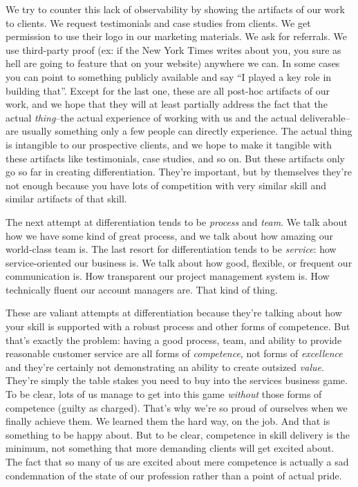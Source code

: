 We try to counter this lack of observability by showing the artifacts of our work to clients. We request testimonials and case studies from clients. We get permission to use their logo in our marketing materials. We ask for referrals. We use third-party proof (ex: if the New York Times writes about you, you sure as hell are going to feature that on your website) anywhere we can. In some cases you can point to something publicly available and say ``I played a key role in building that''. Except for the last one, these are all post-hoc artifacts of our work, and we hope that they will at least partially address the fact that the actual \emph{thing}--the actual experience of working with us and the actual deliverable--are usually something only a few people can directly experience. The actual thing is intangible to our prospective clients, and we hope to make it tangible with these artifacts like testimonials, case studies, and so on. But these artifacts only go so far in creating differentiation. They're important, but by themselves they're not enough because you have lots of competition with very similar skill and similar artifacts of that skill.

The next attempt at differentiation tends to be \emph{process} and \emph{team}. We talk about how we have some kind of great process, and we talk about how amazing our world-class team is. The last resort for differentiation tends to be \emph{service}: how service-oriented our business is. We talk about how good, flexible, or frequent our communication is. How transparent our project management system is. How technically fluent our account managers are. That kind of thing.

These are valiant attempts at differentiation because they're talking about how your skill is supported with a robust process and other forms of competence. But that's exactly the problem: having a good process, team, and ability to provide reasonable customer service are all forms of \emph{competence}, not forms of \emph{excellence} and they're certainly not demonstrating an ability to create outsized \emph{value}. They're simply the table stakes you need to buy into the services business game. To be clear, lots of us manage to get into this game \emph{without} those forms of competence (guilty as charged). That's why we're so proud of ourselves when we finally achieve them. We learned them the hard way, on the job. And that is something to be happy about. But to be clear, competence in skill delivery is the minimum, not something that more demanding clients will get excited about. The fact that so many of us are excited about mere competence is actually a sad condemnation of the state of our profession rather than a point of actual pride.


